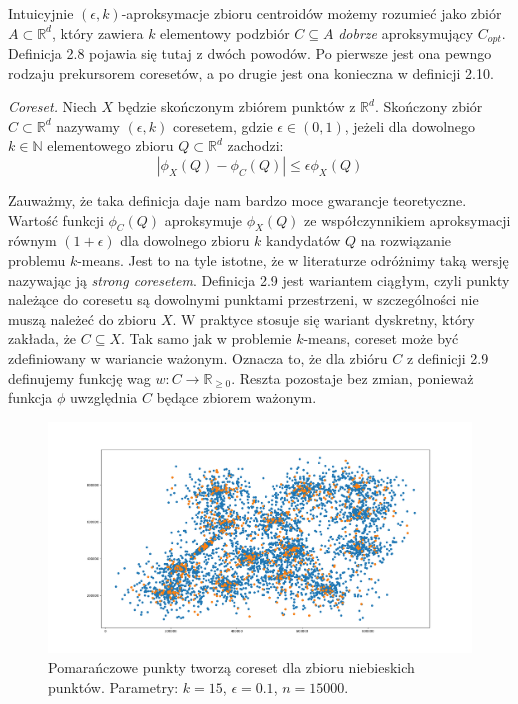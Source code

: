 \noindent
Intuicyjnie $(\epsilon, k)$-aproksymacje zbioru centroidów możemy rozumieć jako zbiór $A \subset \mathbb{R}^{d}$, który zawiera $k$ elementowy podzbiór $C \subseteq A$ \textit{dobrze} aproksymujący $C_{opt}$.
Definicja 2.8 pojawia się tutaj z dwóch powodów.
Po pierwsze jest ona pewngo rodzaju prekursorem coresetów, a po drugie jest ona konieczna w definicji 2.10.

\begin{definition}
    \emph{Coreset.} Niech $X$ będzie skończonym zbiórem punktów z $\mathbb{R}^{d}$.
    Skończony zbiór $C \subset \mathbb{R}^{d}$ nazywamy $(\epsilon, k)$ coresetem, gdzie $\epsilon \in (0, 1)$, jeżeli dla dowolnego $k \in \mathbb{N}$ elementowego zbioru $Q \subset \mathbb{R}^{d}$ zachodzi:
    \begin{equation}
        |\phi_{X}(Q) - \phi_{C}(Q)| \leq \epsilon\phi_{X}(Q)
    \end{equation}
\end{definition}

\noindent
Zauważmy, że taka definicja daje nam bardzo moce gwarancje teoretyczne.
Wartość funkcji $\phi_{C}(Q)$ aproksymuje $\phi_{X}(Q)$ ze współczynnikiem aproksymacji równym $(1+\epsilon)$ dla dowolnego zbioru $k$ kandydatów $Q$ na rozwiązanie problemu $k$-means.
Jest to na tyle istotne, że w literaturze odróżnimy taką wersję nazywając ją \textit{strong coresetem}.
Definicja 2.9 jest wariantem ciągłym, czyli punkty należące do coresetu są dowolnymi punktami przestrzeni, w szczególności nie muszą należeć do zbioru $X$.
W praktyce stosuje się wariant dyskretny, który zakłada, że $C \subseteq X$.
Tak samo jak w problemie $k$-means, coreset może być zdefiniowany w wariancie ważonym.
Oznacza to, że dla zbióru $C$ z definicji 2.9 definujemy funkcję wag $w: C \rightarrow \mathbb{R}_{\ge0}$. 
Reszta pozostaje bez zmian, ponieważ funkcja $\phi$ uwzględnia $C$ będące zbiorem ważonym.
\begin{figure}[H]
    \centering
    \includegraphics[totalheight=7cm]{coreset.png}
    \caption{Pomarańczowe punkty tworzą coreset dla zbioru niebieskich punktów. 
    Parametry: $k=15$, $\epsilon = 0.1$, $n = 15000$.}
\end{figure}

